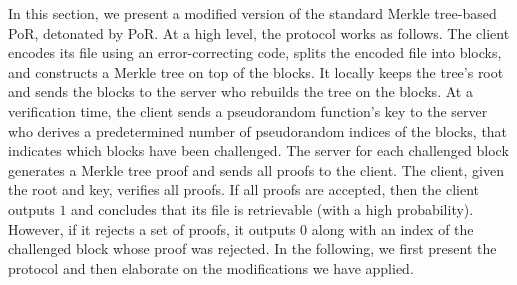 In this section, we present a modified version of the standard Merkle tree-based PoR, detonated by PoR. At a high level, the protocol works as follows. The client encodes its file using an error-correcting code, splits the encoded file into blocks, and constructs a Merkle tree on top of the blocks. It locally keeps the tree's root and sends the blocks to the server who rebuilds the tree on the blocks. At a verification time, the client sends a pseudorandom function's key to the server who derives a predetermined number of pseudorandom  indices of the blocks, that indicates which blocks have been challenged. The server for each challenged block generates a Merkle tree proof and sends all proofs to the client. The client, given the root and   key, verifies all  proofs. If all proofs are accepted, then the client outputs $1$ and concludes that its file is retrievable (with a high probability). However, if  it rejects a set of proofs, it outputs $0$ along with an index of the challenged block whose proof was rejected. In the following, we first present the protocol and then elaborate on the  modifications we have applied. 


